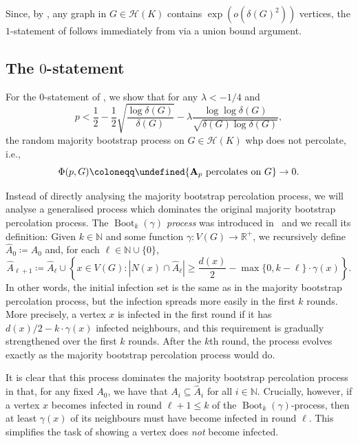 \documentclass[reqno,a4paper,11pt]{amsart}
\theoremstyle{definition}
\newcommand{\Boot}{\operatorname{Boot}}
\newcommand{\dmin}{\delta(G)}
\renewcommand{\leq}{\leqslant}
\renewcommand{\geq}{\geqslant}
\let\Pr\undefined
\begin{document}
Since, by , any graph in $G \in \mathcal{H}(K)$ contains $\exp\left( o\left( \delta(G)^2 \right) \right)$ vertices, the $1$-statement of  follows immediately from  via a union bound argument.

\subsection{The $0$-statement}\label{s:proofof0statement}

For the $0$-statement of , we show that for any $\lambda < -1/4$ and
\[
  p < \frac{1}{2}-\frac{1}{2} \sqrt{\frac{\log \dmin}{\dmin}} - \lambda \frac{\log \log \dmin}{\sqrt{\dmin \log \dmin}},
\]
the random majority bootstrap process on $G \in \mathcal{H}(K)$ whp does not percolate, i.e., $$ \Phi(p,G)\coloneqq \Pr{\textbf{A}_p \text{ percolates on } G} \to 0.$$

Instead of directly analysing the majority bootstrap percolation process, we will analyse a generalised process which dominates the original majority bootstrap percolation process.
The \emph{$\Boot_k(\gamma)$ process} was introduced in~\cite{BaBoMo2009} and we recall its definition: Given $k \in \mathbb{N}$ and some function $\gamma \colon V(G) \to \mathbb{R}^+$, we recursively define $\hat{A}_0 \coloneqq A_0$ and, for each $\ell \in \mathbb{N} \cup \{0\}$,
\[
  \hat{A}_{\ell+1} \coloneqq \hat{A}_\ell \cup \left\{ x \in V(G) : \left|N(x) \cap \hat{A}_\ell \right| \geq \frac{d(x)}{2} - \max\{0, k - \ell\}\cdot \gamma(x) \right\}.
\]
In other words, the initial infection set is the same as in the majority bootstrap percolation process, but the infection spreads more easily in the first $k$ rounds.
More precisely, a vertex $x$ is infected in the first round if it has $d(x)/2 - k\cdot\gamma(x)$ infected neighbours, and this requirement is gradually strengthened over the first $k$ rounds.
After the $k$th round, the process evolves exactly as the majority bootstrap percolation process would do.

It is clear that this process dominates the majority bootstrap percolation process in that, for any fixed $A_0$, we have that $A_i\subseteq \hat{A}_i$ for all $i \in \mathbb{N}$.
Crucially, however, if a vertex $x$ becomes infected in round $\ell+1 \leq k$ of the $\Boot_k(\gamma)$-process, then at least $\gamma(x)$ of its neighbours must have become infected in round $\ell$.
This simplifies the task of showing a vertex does \emph{not} become infected.
\end{document}
